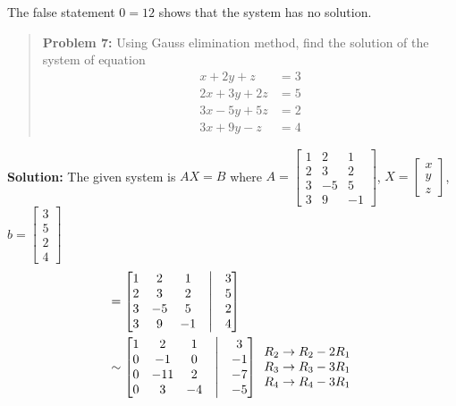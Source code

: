 \documentclass[
  letterpaper,
  DIV=11,
  numbers=noendperiod]{scrreprt}
\begin{document}
The false statement \(0=12\) shows that the system has no solution.

\begin{quote}
\textbf{Problem 7:} Using Gauss elimination method, find the solution of
the system of equation \begin{align*}
x+2y+z &=3\\
2x+3y+2z&=5\\
3x-5y+5z &= 2\\
3x+9y-z &=4
\end{align*}
\end{quote}

\textbf{Solution:} The given system is \(AX=B\) where
\(A=\begin{bmatrix}
    1 &2 &1\\
    2 &3 &2\\
    3 &-5 &5\\
    3 &9 &-1
\end{bmatrix}\), \(X=\begin{bmatrix}
    x\\
    y\\
    z
\end{bmatrix}\), \(b=\begin{bmatrix}
    3\\
    5\\
    2\\
    4
\end{bmatrix}\) \begin{align*}
    [A|b]&=\begin{bmatrix}
        1 &2  &1 &\bigm| &3\\
        2 &3 &2 &\bigm| &5\\
        3 &-5 &5 &\bigm| &2\\
        3 &9 &-1 &\bigm| &4
    \end{bmatrix}\\
    &\sim \begin{bmatrix}
        1 &2  &1 &\bigm| &3\\
        0 &-1 &0 &\bigm| &-1\\
        0 &-11 &2 &\bigm| &-7\\
        0 &3 &-4 &\bigm| &-5
    \end{bmatrix}\begin{array}{c}
        R_2\rightarrow R_2-2R_1\\
        R_3\rightarrow R_3-3R_1\\
        R_4\rightarrow R_4-3R_1
    \end{array}\\

\end{align*}
\end{document}
